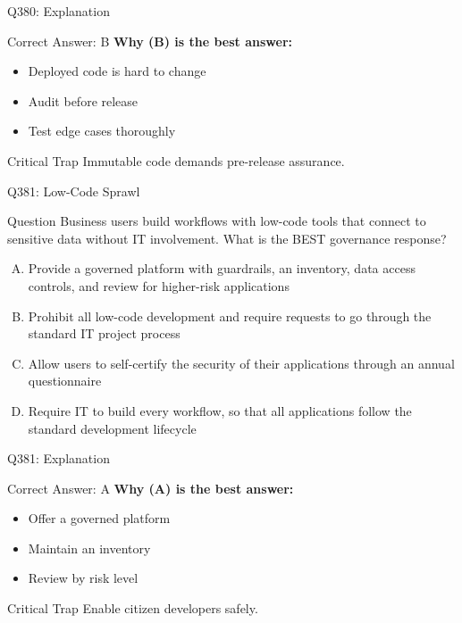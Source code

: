 \documentclass{beamer}
\begin{document}
	\begin{frame}{Q380: Explanation}
		\begin{block}{Correct Answer: B}
			\textbf{Why (B) is the best answer:}
			\begin{itemize}
				\item Deployed code is hard to change
				\item Audit before release
				\item Test edge cases thoroughly
			\end{itemize}
		\end{block}
		\begin{alertblock}{Critical Trap}
			Immutable code demands pre-release assurance.
		\end{alertblock}
	\end{frame}
	
	\begin{frame}{Q381: Low-Code Sprawl}
		\begin{block}{Question}
			\small Business users build workflows with low-code tools that connect to sensitive data without IT involvement. What is the BEST governance response?
		\end{block}
		\begin{enumerate}[(A)]
			\footnotesize
			\item Provide a governed platform with guardrails, an inventory, data access controls, and review for higher-risk applications
			\item Prohibit all low-code development and require requests to go through the standard IT project process
			\item Allow users to self-certify the security of their applications through an annual questionnaire
			\item Require IT to build every workflow, so that all applications follow the standard development lifecycle
		\end{enumerate}
	\end{frame}
	
	\begin{frame}{Q381: Explanation}
		\begin{block}{Correct Answer: A}
			\textbf{Why (A) is the best answer:}
			\begin{itemize}
				\item Offer a governed platform
				\item Maintain an inventory
				\item Review by risk level
			\end{itemize}
		\end{block}
		\begin{alertblock}{Critical Trap}
			Enable citizen developers safely.
		\end{alertblock}
	\end{frame}
	
\end{document}
